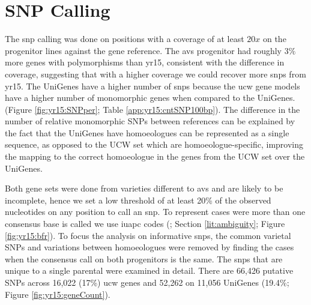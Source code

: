\section{SNP Calling}
\label{yr15:snpCalling}

The \acrshort{snp} calling was done on positions with a coverage of at least $20x$ on the progenitor lines against the gene reference. The \acrshort{avs} progenitor had roughly $3\%$ more genes with polymorphisms than \acrshort{yr15}, consistent with the difference in coverage, suggesting that with a higher coverage we could recover more \acrshort{snp}s from \acrshort{yr15}.
The UniGenes have a higher number of \acrshort{snp}s because the \acrshort{ucw} gene models have a higher number of monomorphic genes when compared to the UniGenes. (Figure {\ref{fig:yr15:SNPper}}; Table \ref{app:yr15:cntSNP100bp}). 
The difference in the number of relative monomorphic SNPs between references can be explained by the fact that the UniGenes have homoeologues can be represented as a single sequence, as opposed to the UCW set which are homoeologue-specific, improving the mapping to the correct homoeologue in the genes from the UCW set over the UniGenes.




Both gene sets were done from varieties different to \acrshort{avs} and are likely to be incomplete, hence we set a low threshold of at least 20\% of the observed nucleotides on any position to call an \acrshort{snp}. 
To represent cases were more than one consensus base is called we use \gls{iuapc} codes (\citet{Cornish-Bowden1985}; Section \ref{lit:ambiguity}; Figure \ref{fig:yr15:bfr}).  
To focus the analysis on informative \acrshort{snp}s, the common varietal SNPs and variations between homoeologues were removed by finding the cases when the consensus call on both progenitors is the same. 
The \acrshort{snp}s that are unique to a single parental were examined in detail. 
There are 66,426 putative SNPs across 16,022 (17\%) \acrshort{ucw} genes and 52,262  on 11,056 UniGenes (19.4\%; Figure \ref{fig:yr15:geneCount}).  

